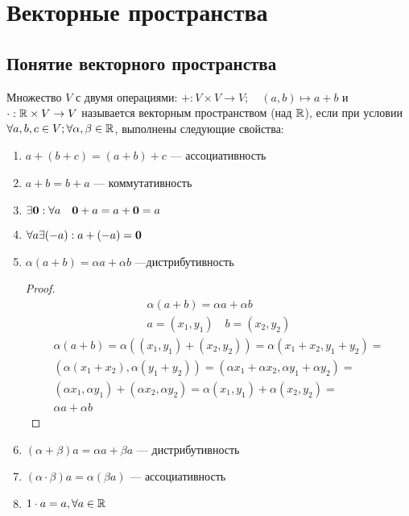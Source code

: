 \documentclass[main]{subfiles}
\begin{document}
\chapter{Векторные пространства}
\section{Понятие векторного пространства}
\begin{definition}
    Множество $V$ с двумя операциями:
    $+:V\times V \to V; \quad (a,b) \mapsto a+b$ и
    $\cdot : \mathbb{R} \times V \to V$ называется векторным пространством (над $\mathbb{R}$),
    если при условии $\forall a,b,c \in V; \forall \alpha, \beta \in \mathbb{R}$, выполнены следующие свойства:

    \begin{enumerate}
        \item $a+(b+c) = (a+b)+c$ --- ассоциативность
        \item $a+b=b+a$ --- коммутативность
        \item $\exists \mathbf{0}:\forall a \quad \mathbf{0}+a=a+\mathbf{0}=a$
        \item $\forall a \exists (-a): a+(-a)=\mathbf{0}$
        \item $\alpha(a+b)=\alpha a + \alpha b$ ---дистрибутивность \begin{proof}
                  \begin{gather*}
                      \alpha (a+b) = \alpha a + \alpha b \\
                      a = (x_1, y_1) \quad b = (x_2, y_2)
                  \end{gather*}
                  \begin{multline*}
                      \alpha(a+b)=\alpha((x_1, y_1)+(x_2, y_2)) = \alpha (x_1+x_2, y_1+y_2)=\\
                      (\alpha(x_1+x_2), \alpha(y_1+y_2))=(\alpha x_1 + \alpha x_2, \alpha y_1 + \alpha y_2)=\\
                      (\alpha x_1, \alpha y_1)+(\alpha x_2, \alpha y_2) = \alpha (x_1, y_1) + \alpha (x_2, y_2)= \\
                      \alpha a + \alpha b
                  \end{multline*}
              \end{proof}
        \item $(\alpha+\beta)a = \alpha a + \beta a$ --- дистрибутивность
        \item $(\alpha \cdot \beta)a = \alpha(\beta a)$ --- ассоциативность
        \item $1\cdot a = a, \forall a \in \mathbb{R}$
    \end{enumerate}
\end{definition}
\end{document}
